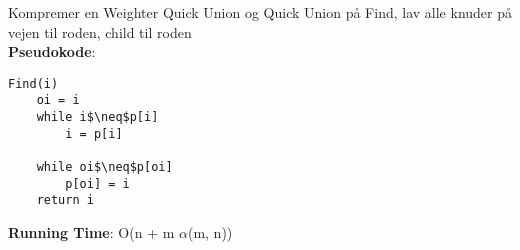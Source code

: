 Kompremer en Weighter Quick Union og Quick Union på Find, lav alle knuder på vejen til roden, child til roden\\
\textbf{Pseudokode}:
\begin{lstlisting}[frame=single, mathescape=true]
Find(i)
	oi = i
	while i$\neq$p[i]
		i = p[i]

	while oi$\neq$p[oi]
		p[oi] = i
	return i
\end{lstlisting}
\textbf{Running Time}: O(n + m $\alpha$(m, n))